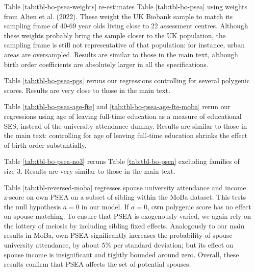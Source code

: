 \documentclass[
  12pt,
]{article}
\theoremstyle{definition}
\theoremstyle{definition}
\theoremstyle{definition}
\theoremstyle{definition}
\theoremstyle{remark}
\begin{document}
Table \ref{tab:tbl-bo-psea-weights} re-estimates Table \ref{tab:tbl-bo-psea}
using weights from Alten et al. (2022). These weight the UK Biobank sample
to match its sampling frame of 40-69 year olds living close to 22 assessment
centres. Although these weights probably bring the sample closer to the UK population, the sampling frame is still not representative of that population:
for instance, urban areas are oversampled. Results are similar to those in
the main text, although birth order coefficients are absolutely larger in all
the specifications.

Table \ref{tab:tbl-bo-psea-pgs} reruns our regressions controlling for
several polygenic scores. Results are very close to those in the main
text.

Table \ref{tab:tbl-bo-psea-age-fte} and \ref{tab:tbl-bo-psea-age-fte-moba}
rerun our regressions using age of leaving full-time education as a
measure of educational SES, instead of the university attendance dummy.
Results are similar to those in the main text: controlling for age of
leaving full-time education shrinks the effect of birth order substantially.

Table \ref{tab:tbl-bo-psea-no3} reruns Table \ref{tab:tbl-bo-psea}
excluding families of size 3. Results are very similar to those in the
main text.

Table \ref{tab:tbl-reversed-moba} regresses spouse university attendance and
income z-score on own PSEA on a subset of sibling within the MoBa dataset. This
tests the null hypothesis \(a = 0\) in our model. If \(a = 0\), own polygenic score
has no effect on spouse matching. To ensure that PSEA is exogenously varied,
we again rely on the lottery of meiosis by including sibling fixed effects.
Analogously to our main results in MoBa, own PSEA significantly increases the
probability of spouse university attendance, by about 5\% per standard
deviation; but its effect on spouse income is insignificant and tightly bounded
around zero. Overall, these results confirm that PSEA affects the set of
potential spouses.
\end{document}
